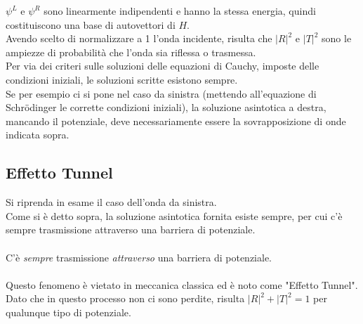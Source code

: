\documentclass[twoside]{article}
\begin{document}
$\psi^L$ e $\psi^R$ sono linearmente indipendenti e hanno la stessa energia, quindi costituiscono una base di autovettori di $H$.
\\
Avendo scelto di normalizzare a 1 l'onda incidente, risulta che $|R|^2$ e $|T|^2$ sono le ampiezze di probabilità che l'onda sia riflessa o trasmessa.
\\
Per via dei criteri sulle soluzioni delle equazioni di Cauchy, imposte delle condizioni iniziali, le soluzioni scritte esistono sempre.
\\
Se per esempio ci si pone nel caso da sinistra (mettendo all'equazione di Schr\"odinger le corrette condizioni iniziali), la soluzione asintotica a destra, mancando il potenziale, deve necessariamente essere la sovrapposizione di onde indicata sopra.

\vspace{0.5cm}

\subsection{Effetto Tunnel}
Si riprenda in esame il caso dell'onda da sinistra.
\\
Come si è detto sopra, la soluzione asintotica fornita esiste sempre, per cui c'è sempre trasmissione attraverso una barriera di potenziale.
\\ \\
C'è \textit{sempre} trasmissione \textit{attraverso} una barriera di potenziale.
\\ \\ 
Questo fenomeno è vietato in meccanica classica ed è noto come "Effetto Tunnel".
\\
Dato che in questo processo non ci sono perdite, risulta $|R|^2+|T|^2=1$ per qualunque tipo di potenziale.

\vspace{0.5cm}
\end{document}

